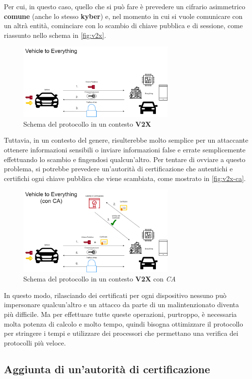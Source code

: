 Per cui, in questo caso, quello che si può fare è prevedere un cifrario asimmetrico \textbf{comune} (anche lo stesso \textbf{kyber}) e, nel momento in cui si vuole comunicare con un altrà entità, cominciare con lo scambio di chiave pubblica e di sessione, come riassunto nello schema in \autoref{fig:v2x}.

\begin{figure}[h]
	\centering
	\includegraphics[width=0.7\textwidth]{capitoli/figure-conclusioni/v2x.png}
	\caption{Schema del protocollo in un contesto \textbf{V2X}}
	\label{fig:v2x}
\end{figure}

Tuttavia, in un contesto del genere, risulterebbe molto semplice per un attaccante ottenere informazioni sensibili o inviare informazioni false e errate semplicemente effettuando lo scambio e fingendosi qualcun'altro. Per tentare di ovviare a questo problema, si potrebbe prevedere un'autorità di certificazione che autentichi e certifichi ogni chiave pubblica che viene scambiata, come mostrato in \autoref{fig:v2x-ca}.

\begin{figure}[h]
	\centering
	\includegraphics[width=0.7\textwidth]{capitoli/figure-conclusioni/v2x-ca.png}
	\caption{Schema del protocollo in un contesto \textbf{V2X} con \emph{CA}}
	\label{fig:v2x-ca}
\end{figure}

In questo modo, rilasciando dei certificati per ogni dispositivo nessuno può impersonare qualcun'altro e un attacco da parte di un malintenzionato diventa più difficile. Ma per effettuare tutte queste operazioni, purtroppo, è necessaria molta potenza di calcolo e molto tempo, quindi bisogna ottimizzare il protocollo per stringere i tempi e utilizzare dei processori che permettano una verifica dei protocolli più veloce.

\subsection{Aggiunta di un'autorità di certificazione}


\newpage
